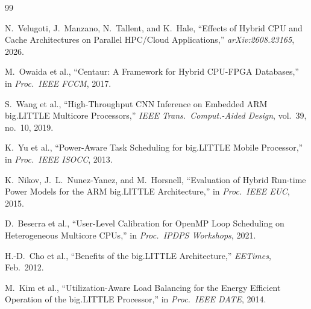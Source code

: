 \documentclass[conference]{IEEEtran}
\begin{document}

\begin{thebibliography}{99}

N.~Velugoti, J.~Manzano, N.~Tallent, and K.~Hale,
``Effects of Hybrid CPU and Cache Architectures on Parallel HPC/Cloud
Applications,''
\textit{arXiv:2608.23165}, 2026.

M.~Owaida et al.,
``Centaur: A Framework for Hybrid CPU-FPGA Databases,''
in \textit{Proc.\ IEEE FCCM}, 2017.

S.~Wang et al.,
``High-Throughput CNN Inference on Embedded ARM big.LITTLE Multicore
Processors,''
\textit{IEEE Trans.\ Comput.-Aided Design}, vol.~39, no.~10, 2019.

K.~Yu et al.,
``Power-Aware Task Scheduling for big.LITTLE Mobile Processor,''
in \textit{Proc.\ IEEE ISOCC}, 2013.

K.~Nikov, J.~L.~Nunez-Yanez, and M.~Horsnell,
``Evaluation of Hybrid Run-time Power Models for the ARM big.LITTLE
Architecture,''
in \textit{Proc.\ IEEE EUC}, 2015.

D.~Beserra et al.,
``User-Level Calibration for OpenMP Loop Scheduling on Heterogeneous
Multicore CPUs,''
in \textit{Proc.\ IPDPS Workshops}, 2021.

H.-D.~Cho et al.,
``Benefits of the big.LITTLE Architecture,''
\textit{EETimes}, Feb.\ 2012.

M.~Kim et al.,
``Utilization-Aware Load Balancing for the Energy Efficient Operation of
the big.LITTLE Processor,''
in \textit{Proc.\ IEEE DATE}, 2014.

\end{thebibliography}
\end{document}
